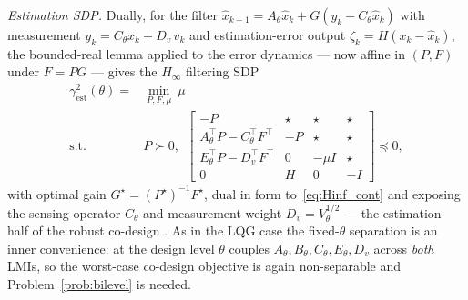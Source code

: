 \documentclass[twocolumn,amsthm]{autart}
\begin{document}
\emph{Estimation SDP.} Dually, for the filter
$\hat x_{k+1} = A_\theta \hat x_k + G(y_k - C_\theta \hat x_k)$ with measurement
$y_k = C_\theta x_k + D_{v}\,v_k$ and estimation-error output
$\zeta_k = H(x_k - \hat x_k)$, the bounded-real lemma applied to the error
dynamics --- now affine in $(P,F)$ under $F = P G$ --- gives the $H_\infty$
filtering SDP
\begin{equation}\label{eq:Hinf_est}
\begin{aligned}
\gamma^2_{\mathrm{est}}(\theta) = &\min_{P,F,\mu}\ \mu \\
\text{s.t. } & P \succ 0,\ \
\begin{bmatrix}
-P & \star & \star & \star \\
A_\theta^\top P - C_\theta^\top F^\top & -P & \star & \star \\
E_\theta^\top P - D_v^\top F^\top & 0 & -\mu I & \star \\
0 & H & 0 & -I
\end{bmatrix} \preceq 0,
\end{aligned}
\end{equation}
with optimal gain $G^\star = (P^\star)^{-1} F^\star$, dual in form
to~\eqref{eq:Hinf_cont} and exposing the sensing operator $C_\theta$ and
measurement weight $D_v = V_\theta^{1/2}$ --- the estimation half of the robust
co-design \cite{li2008integrating}. As in the LQG case the fixed-$\theta$
separation is an inner convenience: at the design level $\theta$ couples
$A_\theta, B_\theta, C_\theta, E_\theta, D_v$ across \emph{both} LMIs, so the
worst-case co-design objective is again non-separable and Problem~\ref{prob:bilevel}
is needed.
\end{document}
